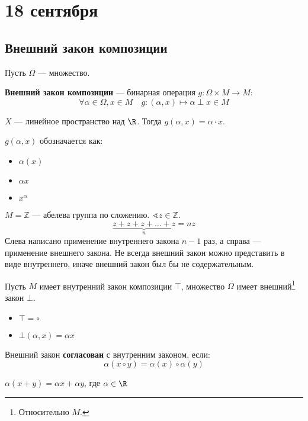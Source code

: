 \chapter{18 сентября}

\section{Внешний закон композиции}

Пусть \(\Omega\) --- множество.
\begin{definition}
    \textbf{Внешний закон композиции} --- бинарная операция \(g : \Omega \times M \to M\):
    \[\forall \alpha \in \Omega, x \in M \quad g : (\alpha, x) \mapsto \alpha \perp x \in M\]
\end{definition}
\begin{example}
    \(X\) --- линейное пространство над \(\R\). Тогда \(g(\alpha, x) = \alpha \cdot x\).
\end{example}
\begin{notation}
    \(g(\alpha, x)\) обозначается как:
    \begin{itemize}
        \item \(\alpha(x)\)
        \item \(\alpha x\)
        \item \(x^\alpha\)
    \end{itemize}
\end{notation}

\begin{example}
    \(M = \mathbb{Z}\) --- абелева группа по сложению. \(\sphericalangle z \in \mathbb{Z}\).
    \[\underbrace{z + z + z + \dots + z}_n = nz\]
    Слева написано применение внутреннего закона \(n - 1\) раз, а справа --- применение внешнего закона. Не всегда внешний закон можно представить в виде внутреннего, иначе внешний закон был бы не содержательным.
\end{example}

Пусть \(M\) имеет внутренний закон композиции \(\top\), множество \(\Omega\) имеет внешний\footnote{Относительно \(M\).} закон \(\bot\).
\begin{notation}\itemfix
    \begin{itemize}
        \item \(\top = \circ\)
        \item \(\bot(\alpha, x) = \alpha x\)
    \end{itemize}
\end{notation}
\begin{definition}
    Внешний закон \textbf{согласован} с внутренним законом, если:
    \[\alpha(x \circ y) = \alpha(x) \circ \alpha(y)\]
\end{definition}
\begin{example}
    \(\alpha(x + y) = \alpha x + \alpha y\), где \(\alpha \in \R\)
\end{example}

